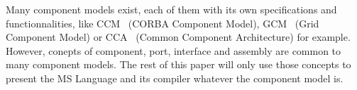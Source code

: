 Many component models exist, each of them with its own specifications and functionnalities, like CCM~\cite{corba:omg06} (CORBA Component Model), GCM~\cite{Baude} (Grid Component Model) or CCA~\cite{Armstrong:1999:TCC:822084.823232} (Common Component Architecture) for example. However, conepts of component, port, interface and assembly are common to many component models. The rest of this paper will only use those concepts to present the MS Language and its compiler whatever the component model is.

